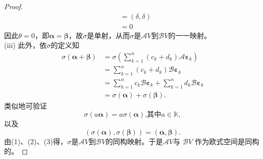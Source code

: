 \begin{enumerate}[1~]
\begin{proof}
\begin{align*}
& = ( \delta , \delta ) \\ 
& = 0 
\end{align*}
因此$\theta = 0$，即$\boldsymbol{\alpha}=\boldsymbol{\beta}$，故$\sigma$是单射，从而$\sigma$是$\mathscr{A}V$到$\mathscr{B}V$的一一映射。\\
(iii) 此外，依$\sigma$的定义知
\begin{align*} 
\sigma (  { \boldsymbol{\alpha} } +  { \boldsymbol{\beta} } ) 
 & = \sigma \left( \sum _ { k = 1 } ^ { n } \left( c _ { k } + d _ { k } \right)  { \mathscr{A}\boldsymbol{\varepsilon} } _ { k } \right) \\
 & = \sum _ { k = 1 } ^ { n } \left( c _ { k } + d _ { k } \right)  { \mathscr{B}\boldsymbol{\varepsilon} } _ { k } \\ 
 & = \sum _ { k = 1 } ^ { n } c _ { k }  { \mathscr{B}\boldsymbol{\varepsilon} } _ { k } + \sum _ { k = 1 } ^ { n } d _ { k }  { \mathscr{B}\boldsymbol{\varepsilon} } _ { k } \\
 & = \sigma (  { \boldsymbol{\alpha} } ) + \sigma (  { \boldsymbol{\beta} } ) .
\end{align*}
类似地可验证\[
\sigma ( a  { \boldsymbol{\alpha} } ) = a \sigma (  { \boldsymbol{\alpha} } )\text{,其中$a\in\mathbb{K}$},
\]
以及\[
( \sigma (  { \boldsymbol{\alpha} } ) , \sigma (  { \boldsymbol{\beta} } ) ) = (  { \boldsymbol{\alpha} } ,  { \boldsymbol{\beta} } ).
\]
由(1)、(2)、(3)得，$\sigma$是$\mathscr{A}V$到$\mathscr{B}V$的同构映射。于是$\mathscr{A}V$与 $\mathscr{B}V$ 作为欧式空间是同构的。
\end{proof}

\end{enumerate}
\endinput